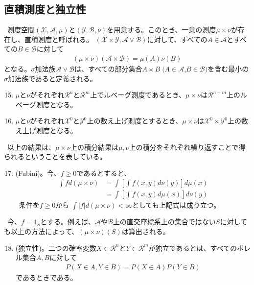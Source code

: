 \documentclass[a4j,12pt]{jarticle}
\begin{document}
\subsection{直積測度と独立性}
\ 測度空間$(\mathcal{X},\mathcal{A},\mu)$と$(\mathcal{Y},\mathcal{B},\nu)$を用意する。このとき、一意の測度$\mu × \nu$が存在し、直積測度と呼ばれる。
$(\mathcal{X}×\mathcal{Y}, \mathcal{A} \lor \mathcal{B})$に対して、すべての$A \in \mathcal{A}$とすべての$B \in \mathcal{B}$に対して
\begin{align*}
(\mu × \nu)(\mathcal{A} × \mathcal{B}) = \mu(A)\nu(B)
\end{align*}
となる。$\sigma$加法族$\mathcal{A} \lor \mathcal{B}$は、すべての部分集合$A × B \; (A \in \mathcal{A}$,$B \in \mathcal{B})$を含む最小の$\sigma$加法族であると定義される。
\begin{enumerate}[label=例1.\arabic*]
\setcounter{enumi}{14}
\item $\mu$と$\nu$がそれぞれ$\mathcal{R}^{n}$と$\mathcal{R}^{m}$上でルベーグ測度であるとき、$\mu × \nu$は$\mathcal{R}^{n+m}$上のルベーグ測度となる。
\item $\mu$と$\nu$がそれぞれ$\mathcal{X}^{0}$と$\mathcal{Y}^{0}$上の数え上げ測度とするとき、$\mu×\nu$は$\mathcal{X}^{0}×\mathcal{Y}^{0}$上の数え上げ測度となる。
\end{enumerate}
\ 以上の結果は、$\mu × \nu$上の積分結果は$\mu,\nu$上の積分をそれぞれ繰り返すことで得られるということを表している。
\begin{enumerate}[label = 定理1.\arabic*]
\setcounter{enumi}{16}
\item (Fubini)。今、$f \geq 0$であるとすると、
\begin{align*}
\int f d(\mu × \nu) &= \int \left[\int f (x,y) d\nu(y)\right]d\mu(x) \\
&=  \int \left[\int f (x,y) d\mu(x)\right]d\nu(y)
\end{align*}
\ 条件を$f \geq 0$から $\int |f|d(\mu × \nu) < \infty$としても上記式は成り立つ。　
\end{enumerate}
\ 今、$ f= 1_{S}$とする。例えば、$\mathcal{A}や\mathcal{B}$上の直交座標系上の集合ではない$S$に対しても以上の方法によって、$(\mu × \nu)(S)$は算出される。
\begin{enumerate}[label = 定義1.\arabic*]
\setcounter{enumi}{17}
\item(独立性)。二つの確率変数$X \in \mathcal{R}^{n}$と$Y \in \mathcal{R}^{m}$が独立であるとは、すべてのボレル集合$A,B$に対して
\begin{align}
\label{s}
P(X \in A , Y \in B) = P(X \in A)P(Y \in B)
\end{align}
であるときである。
\end{enumerate}
\end{document}
